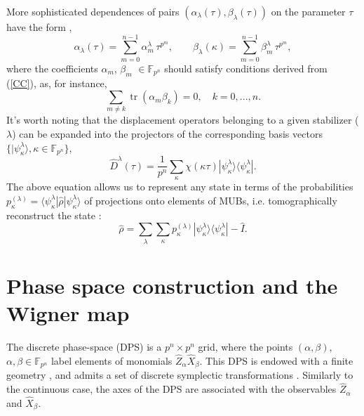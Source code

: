 \documentclass{article}
\DeclareMathOperator{\tr}{tr}
\begin{document}
More sophisticated dependences of pairs
$\left(\alpha_{\lambda}(\tau),\beta_{\lambda }(\tau)\right)$ on the parameter
$\tau$ have the form \cite{GS2,JPA09}, 
\begin{equation}
  \alpha_{\lambda }(\tau)
  = \sum_{m=0}^{n-1} \alpha_{m}^{\lambda } \, \tau^{p^{m}},
  \qquad
  \beta_{\lambda}(\kappa)
  = \sum_{m=0}^{n-1}\beta_{m}^{\lambda} \, \tau^{p^{m}},
  \label{curve1}
\end{equation}
where the coefficients $\alpha _{m}$, $\beta _{m}$ $\in \mathbb{F}_{p^{n}}$
should satisfy conditions derived from (\ref{CC}), as, for instance, 
\begin{equation*}
  \sum_{m \neq k} \tr(\alpha_{m}\beta _{k})=0,
  \quad k = 0,...,n.
\end{equation*}
It's worth noting that the displacement operators belonging to a given
stabilizer ($\lambda$) can be expanded into the projectors of the
corresponding basis vectors $\{|\psi_{\kappa }^{\lambda }\rangle, \kappa \in
\mathbb{F}_{p^{n}}\}$,
\begin{equation}
  \hat{D}^{\lambda}(\tau)
  = \frac{1}{p^{n}} \sum_{\kappa }\chi(\kappa \tau)
  |\psi_{\kappa}^{\lambda}\rangle \langle\psi_{\kappa}^{\lambda}|.
  \label{Dexp}
\end{equation}
The above equation allows us to represent any state in terms of the
probabilities $p_{\kappa}^{(\lambda)} = \langle \psi_{\kappa }^{\lambda }|
\hat{\rho}|\psi_{\kappa}^{\lambda}\rangle$ of projections onto elements
of MUBs, i.e. tomographically reconstruct the state
\cite{gibbons,galvao,cormick,ivanovic,DFW11,DFW12,Durt2006}: 
\begin{equation}
  \hat{\rho}
  = \sum_{\lambda}\sum_{\kappa}p_{\kappa}^{(\lambda)}
  |\psi_{\kappa }^{\lambda}\rangle \langle \psi_{\kappa}^{\lambda}|
  - \hat{I}.
  \label{tom r}
\end{equation}

\section{Phase space construction and the Wigner map}

The discrete phase-space (DPS) \cite{gibbons,galvao,cormick,DFW11,DFW12} is a
$p^{n}\times p^{n}$ grid, where the points $(\alpha ,\beta )$, $\alpha,\beta \in
\mathbb{F}_{p^{n}}$ label elements of monomials $\hat{Z}_{\alpha
}\hat{X}_{\beta}$. This DPS is endowed with a finite geometry
\cite{gibbons,galvao,cormick,DFW11,DFW12,FF}, and admits a set of discrete
symplectic transformations \cite{DFW2-1,DFW2-2,DFW2-3,DFW2-4,klimov06}.
Similarly to the continuous case, the axes of the DPS are associated with the
observables $\hat{Z}_{\alpha}$ and $\hat{X}_{\beta}$.
\end{document}
